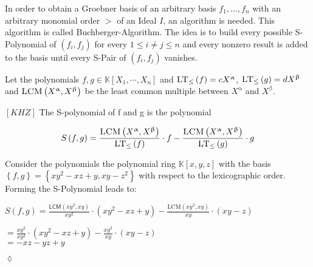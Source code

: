 In order to obtain a Groebner basis of an arbitrary basis $f_{1}, \ldots , f_{n}$ with an arbitrary monomial order $>$ of an Ideal $I$, an algorithm is needed. This algorithm is called Buchberger-Algorithm. The idea is to build every possible S-Polynomial of $\left( f_{i},f_{j}\right) $ for every $ 1 \leq i \neq j \leq n $ and every nonzero result is added to the basis until every S-Pair of $\left( f_{i},f_{j}\right) $ vanishes.

Let the polynomials $f,g \in \mathbb{K}\left[X_{1}, \cdots, X_{n}\right] $ and $\textsc{LT}_{\leq}\left(f \right) = cX^{\upalpha} $, $\textsc{LT}_{\leq}\left(g \right) = dX^{\upbeta} $ and $\textsc{LCM}\left( X^{\upalpha},X^{\upbeta}\right) $ be the least common multiple between $X^{\upalpha}$ and $X^{\upbeta}$. 

\begin{env_definition}[S-Polynomial]
$\left[ KHZ\right] $ The S-polynomial of f and g is the polynomial

\[ S\left( f,g\right) = \frac{\textsc{LCM}\left( X^{\upalpha}, X^{\upbeta}\right) }{\textsc{LT}_{\leq}\left( f\right) } \cdot f - \frac{ \textsc{LCM}\left( X^{\upalpha}, X^{\upbeta}\right) }{\textsc{LT}_{\leq}\left( g\right) } 
\cdot g \]


\end{env_definition}

\newpage

\begin{env_example}\normalfont
Consider the polynomials the polynomial ring $\mathbb{K}\left[ x,y,z\right] $ with
the basis $\left\lbrace f,g\right\rbrace = \left\lbrace xy^{2}-xz+y,xy-z^{2} \right\rbrace $ with respect to the lexicographic order.\\
Forming the S-Polynomial leads to:

\begin{center}
$
 S\left( f,g\right) = \frac{\textsf{LCM}\left( xy^{2}, xy \right) } {xy^{2} } \cdot \left(  xy^{2}-xz+y\right) - \frac{\textrm{LCM}\left( xy^{2}, xy \right) } {xy } \cdot \left( xy-z \right)  
$

 $ = \frac{xy^{2}}{xy^{2}} \cdot \left( xy^{2}-xz+y\right) - \frac{xy^{2}}{xy} \cdot \left( xy-z\right) $\\
 $ = -xz-yz+y $
\end{center}


\begin{flushright}
$\lozenge$
\end{flushright} 
\end{env_example}


